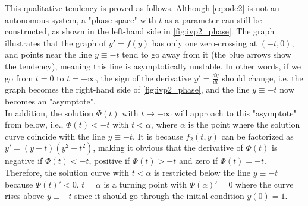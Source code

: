 \documentclass[a4paper]{article}
\begin{document}
    \begin{table}[H]
    \centering
    \caption{Using Four Euler Method to Compute y Value}
    \label{tab:IVP2_y}
    \end{table}
    
    This qualitative tendency is proved as follows. Although \autoref{eq:ode2} is not an autonomous system, a "phase space" with $t$ as a parameter can still be constructed, as shown in the left-hand side in \autoref{fig:ivp2_phase}. The graph illustrates that the graph of $y' = f(y)$ has only one zero-crossing at $(-t, 0)$, and points near the line $y \equiv -t$ tend to go away from it (the blue arrows show the tendency), meaning this line is asymptotically unstable. In other words, if we go from $t = 0$ to $t = -\infty$, the sign of the derivative $y' = \frac{dy}{dt}$ should change, i.e. the graph becomes the right-hand side of \autoref{fig:ivp2_phase}, and the line $y \equiv -t$ now becomes an "asymptote". \\
    
    In addition, the solution $\Phi(t)$ with $t \rightarrow -\infty$ will approach to this "asymptote" from below, i.e., $\Phi(t) < -t$ with $t < \alpha$, where $\alpha$ is the point where the solution curve coincide with the line $y \equiv -t$. It is because $f_2(t, y)$ can be factorized as $y' = (y + t)(y^2 + t^2)$, making it obvious that the derivative of $\Phi(t)$ is negative if $\Phi(t) < -t$, positive if $\Phi(t) > -t$ and zero if $\Phi(t) = -t$. Therefore, the solution curve with $t < \alpha$ is restricted below the line $y \equiv -t$ because $\Phi(t)' < 0$. $t = \alpha$ is a turning point with $\Phi(\alpha)' = 0$ where the curve rises above $y \equiv -t$ since it should go through the initial condition $y(0) = 1$.
    
\end{document}
